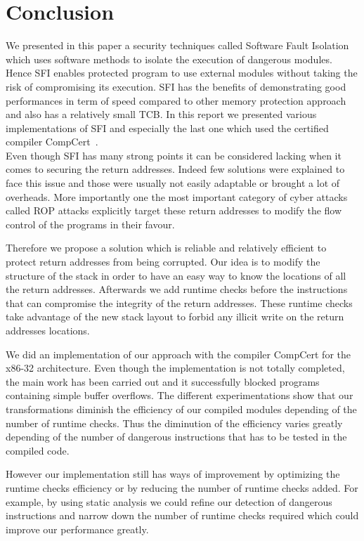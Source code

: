 \documentclass[11pt]{sdm}
\begin{document}
\section{Conclusion}
\label{sec:Conclusion}
We presented in this paper a security techniques called Software Fault Isolation which uses software methods to isolate the execution of dangerous modules. Hence SFI enables protected program to use external modules without taking the risk of compromising its execution. SFI has the benefits of demonstrating good performances in term of speed compared to other memory protection approach and also has a relatively small TCB. In this report we presented various implementations of SFI and especially the last one which used the certified compiler CompCert~\cite{Kroll:2014:PSF:2708449.2708686}. \\
Even though SFI has many strong points it can be considered lacking when it comes to securing the return addresses. Indeed few solutions were explained to face this issue and those were usually not easily adaptable or brought a lot of overheads. More importantly one the most important category of cyber attacks called ROP attacks explicitly target these return addresses to modify the flow control of the programs in their favour.

Therefore we propose a solution which is reliable and relatively efficient to protect return addresses from being corrupted. Our idea is to modify the structure of the stack in order to have an easy way to know the locations of all the return addresses. Afterwards we add runtime checks before the instructions that can compromise the integrity of the return addresses. These runtime checks take advantage of the new stack layout to forbid any illicit write on the return addresses locations.

We did an implementation of our approach with the compiler CompCert for the x86-32 architecture. Even though the implementation is not totally completed, the main work has been carried out and it successfully blocked programs containing simple buffer overflows. The different experimentations show that our transformations diminish the efficiency of our compiled modules depending of the number of runtime checks. Thus the diminution of the efficiency varies greatly depending of the number of dangerous instructions that has to be tested in the compiled code.

However our implementation still has ways of improvement by optimizing the runtime checks efficiency or by reducing the number of runtime checks added. For example, by using static analysis we could refine our detection of dangerous instructions and narrow down the number of runtime checks required which could improve our performance greatly.


\newpage


\end{document}
